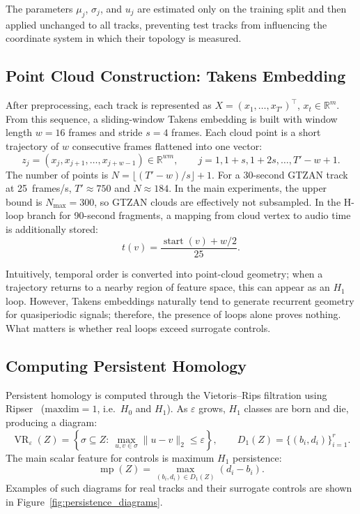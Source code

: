 The parameters $\mu_j$, $\sigma_j$, and $u_j$ are estimated only on the training split and then applied unchanged to all tracks, preventing test tracks from influencing the coordinate system in which their topology is measured.

\subsection{Point Cloud Construction: Takens Embedding}\label{ssec:takens}

After preprocessing, each track is represented as $X=(x_1,\ldots,x_{T'})^\top$, $x_t\in\mathbb{R}^{m}$. From this sequence, a sliding-window Takens embedding is built with window length $w=16$ frames and stride $s=4$ frames. Each cloud point is a short trajectory of $w$ consecutive frames flattened into one vector:
\begin{equation}\label{eq:takens}
z_j = (x_j,x_{j+1},\ldots,x_{j+w-1}) \in \mathbb{R}^{wm},\qquad
j=1,1{+}s,1{+}2s,\ldots,T'{-}w{+}1.
\end{equation}
The number of points is $N = \lfloor (T'-w)/s\rfloor+1$. For a 30-second GTZAN track at 25~frames/s, $T'\approx750$ and $N\approx184$. In the main experiments, the upper bound is $N_{\max}=300$, so GTZAN clouds are effectively not subsampled. In the H-loop branch for 90-second fragments, a mapping from cloud vertex to audio time is additionally stored:
\begin{equation}\label{eq:time_map}
t(v)=\frac{\operatorname{start}(v)+w/2}{25}.
\end{equation}

Intuitively, temporal order is converted into point-cloud geometry; when a trajectory returns to a nearby region of feature space, this can appear as an $H_1$ loop. However, Takens embeddings naturally tend to generate recurrent geometry for quasiperiodic signals; therefore, the presence of loops alone proves nothing. What matters is whether real loops exceed surrogate controls.

\subsection{Computing Persistent Homology}\label{ssec:ph}

Persistent homology is computed through the Vietoris--Rips filtration using Ripser~\cite{bauer2021ripser} ($\text{maxdim}=1$, i.e.\ $H_0$ and $H_1$). As $\varepsilon$ grows, $H_1$ classes are born and die, producing a diagram:
\begin{equation}\label{eq:vr}
\operatorname{VR}_\varepsilon(Z)=
\left\{\sigma\subseteq Z:\ \max_{u,v\in\sigma}\|u-v\|_2\le \varepsilon\right\},
\qquad
D_1(Z)=\{(b_i,d_i)\}_{i=1}^{r}.
\end{equation}
The main scalar feature for controls is maximum $H_1$ persistence:
\begin{equation}\label{eq:maxpers}
\operatorname{mp}(Z)=\max_{(b_i,d_i)\in D_1(Z)}(d_i-b_i).
\end{equation}
Examples of such diagrams for real tracks and their surrogate controls are shown in Figure~\ref{fig:persistence_diagrams}.

